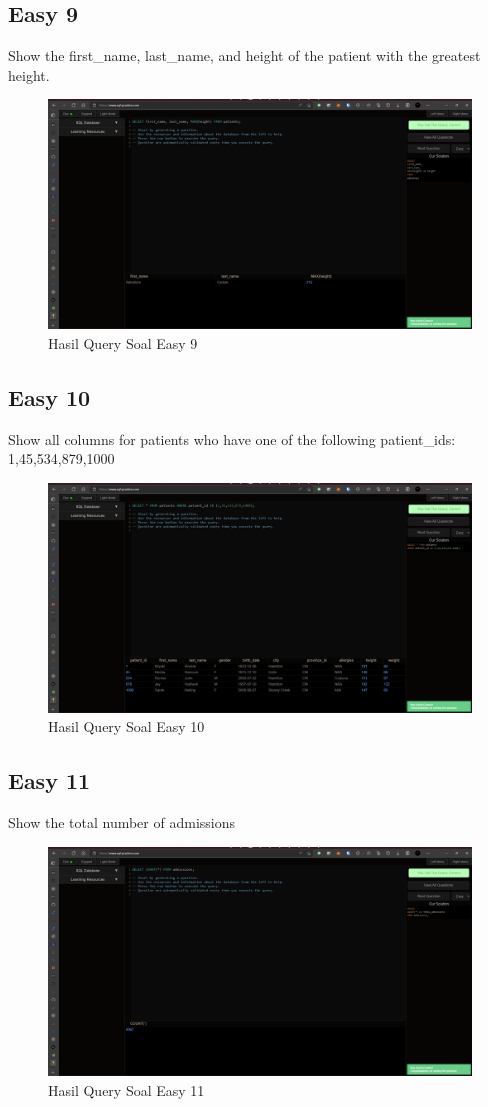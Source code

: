 \documentclass[]{article}
\begin{document}
\subsection{Easy 9}
Show the first\_name, last\_name, and height of the patient with the greatest height.

\begin{figure}[H]
    \centering
    \includegraphics[width=12cm]{easy-9.png}
    \caption{Hasil Query Soal Easy 9}
\end{figure}
\subsection{Easy 10}
Show all columns for patients who have one of the following patient\_ids: 1,45,534,879,1000

\begin{figure}[H]
    \centering
    \includegraphics[width=12cm]{easy-10.png}
    \caption{Hasil Query Soal Easy 10}
\end{figure}
\subsection{Easy 11}
Show the total number of admissions


\begin{figure}[H]
    \centering
    \includegraphics[width=12cm]{easy-11.png}
    \caption{Hasil Query Soal Easy 11}
\end{figure}
\end{document}
